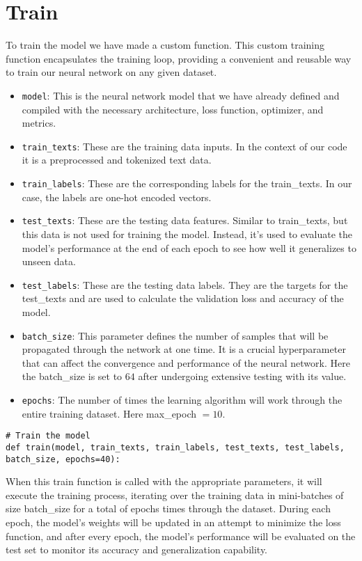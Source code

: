 \section{Train}
To train the model we have made a custom function. This custom training function encapsulates the training loop, providing a convenient and reusable way to train our neural network on any given dataset.

\begin{itemize}
	\item \verb*|model|: This is the neural network model that we have already defined and compiled with the necessary architecture, loss function, optimizer, and metrics.
	
	\item \verb*|train_texts|: These are the training data inputs. In the context of our code it is a preprocessed and tokenized text data.
	
	\item \verb*|train_labels|: These are the corresponding labels for the train\_texts. In our case, the labels are one-hot encoded vectors.
	
	\item \verb*|test_texts|: These are the testing data features. Similar to train\_texts, but this data is not used for training the model. Instead, it's used to evaluate the model's performance at the end of each epoch to see how well it generalizes to unseen data.
	
	\item \verb*|test_labels|: These are the testing data labels. They are the targets for the test\_texts and are used to calculate the validation loss and accuracy of the model.
	
	\item \verb*|batch_size|: This parameter defines the number of samples that will be propagated through the network at one time. It is a crucial hyperparameter that can affect the convergence and performance of the neural network. Here the batch\_size is set to $64$ after undergoing extensive testing with its value.
	
	\item \verb*|epochs|: The number of times the learning algorithm will work through the entire training dataset. Here max\_epoch $= 10$.
\end{itemize}

\begin{lstlisting}
# Train the model
def train(model, train_texts, train_labels, test_texts, test_labels, batch_size, epochs=40):
\end{lstlisting}

When this train function is called with the appropriate parameters, it will execute the training process, iterating over the training data in mini-batches of size batch\_size for a total of epochs times through the dataset. During each epoch, the model's weights will be updated in an attempt to minimize the loss function, and after every epoch, the model's performance will be evaluated on the test set to monitor its accuracy and generalization capability.